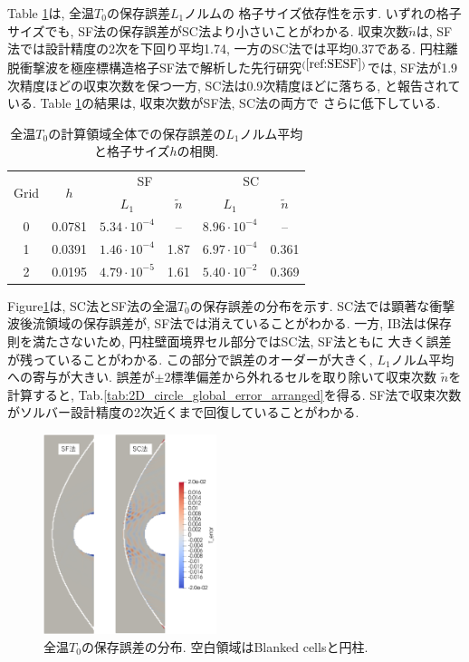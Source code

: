 \documentclass[a4j]{jarticle}
\begin{document}
Table \ref{tab:2D_circle_global_error}は, 全温$T_0$の保存誤差$L_1$ノルムの
格子サイズ依存性を示す. いずれの格子サイズでも, SF法の保存誤差がSC法より小さいことがわかる.
収束次数$\tilde{n}$は, SF法では設計精度の2次を下回り平均1.74, 一方のSC法では平均0.37である.
円柱離脱衝撃波を極座標構造格子SF法で解析した先行研究$^{(\ref{ref:SESF})}$では,
SF法が1.9次精度ほどの収束次数を保つ一方, SC法は0.9次精度ほどに落ちる, と報告されている.
Table \ref{tab:2D_circle_global_error}の結果は, 収束次数がSF法, SC法の両方で
さらに低下している.

\begin{table}[h]
  \centering
  \caption{全温$T_0$の計算領域全体での保存誤差の$L_1$ノルム平均と格子サイズ$h$の相関.}
  \begin{tabular}{cccccc}
    \toprule
    \multirow{2}{*}{Grid} & \multirow{2}{*}{$h$}
    & \multicolumn{2}{c}{SF} & \multicolumn{2}{c}{SC} \\
    \cmidrule(lr){3-4} \cmidrule(lr){5-6}
    & & $L_1$ & $\tilde{n}$ & $L_1$ & $\tilde{n}$ \\
    \midrule
    0 & 0.0781 & $5.34 \cdot 10^{-4}$ & –    & $8.96 \cdot 10^{-4}$ & – \\
    1 & 0.0391 & $1.46 \cdot 10^{-4}$ & 1.87 & $6.97 \cdot 10^{-4}$ & 0.361 \\
    2 & 0.0195 & $4.79 \cdot 10^{-5}$ & 1.61 & $5.40 \cdot 10^{-2}$ & 0.369 \\
    \bottomrule
  \end{tabular} 
  \label{tab:2D_circle_global_error}
\end{table}

Figure\ref{fig:2Dcircle_t_error_distribution}は, SC法とSF法の全温$T_0$の保存誤差の分布を示す.
SC法では顕著な衝撃波後流領域の保存誤差が, SF法では消えていることがわかる.
一方, IB法は保存則を満たさないため, 円柱壁面境界セル部分ではSC法, SF法ともに
大きく誤差が残っていることがわかる.
この部分で誤差のオーダーが大きく, $L_1$ノルム平均への寄与が大きい. 
誤差が$\pm 2$標準偏差から外れるセルを取り除いて収束次数 $\tilde{n}$を計算すると,
Tab.\ref{tab:2D_circle_global_error_arranged}を得る.
SF法で収束次数がソルバー設計精度の2次近くまで回復していることがわかる. 

\begin{figure}[h]
    \begin{center}
        \includegraphics[width=0.45\textwidth]{t_error_distribution.pdf}
    \end{center}
    \caption{全温$T_0$の保存誤差の分布. 空白領域はBlanked cellsと円柱.}
    \label{fig:2Dcircle_t_error_distribution}
\end{figure}
\end{document}
